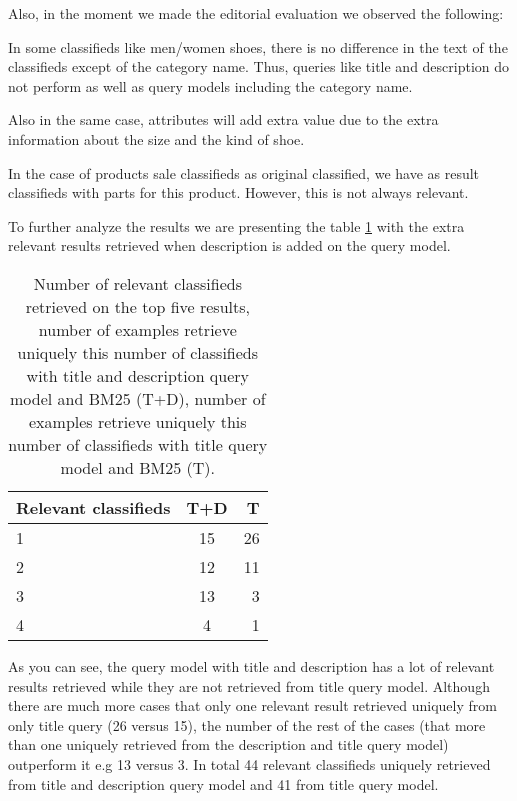 Also, in the moment we made the editorial evaluation we observed the following:

\begin{list}{.}{}
\item{In some classifieds like men/women shoes, there is no difference in the text of the classifieds except of the category name. Thus, queries like title and description do not perform as well as query models including the category name.}
\item{Also in the same case, attributes will add extra value due to the extra information about the size and the kind of shoe.}
\item{In the case of products sale classifieds as original classified, we have as result classifieds with parts for this product. However, this is not always relevant.}
\end{list}
To further analyze the results we are presenting the table \ref{table:titleVsTD} with the extra relevant results retrieved when description is added on the query model.


\begin{table}[H]
\begin{center}
\caption{Number of relevant classifieds retrieved on the top five results, number of examples retrieve uniquely this number of classifieds with title and description query model and BM25 (T+D), number of examples retrieve uniquely this number of classifieds with title query model and BM25 (T).}
\label{table:titleVsTD}
\begin{tabular}{lcr}
\midrule
Relevant classifieds & T+D & T \\
\midrule
	1 & 15 & 26 \\
	2 & 12 & 11  \\
	3 & 13 & 3 \\
	4 & 4 & 1  \\
\bottomrule
\end{tabular}
\end{center}
\end{table}

As you can see, the query model with title and description has a lot of relevant results retrieved while they are not retrieved from title query model. Although there are much more cases that only one relevant result retrieved uniquely from only title query (26 versus 15), the number of the rest of the cases (that more than one uniquely retrieved from the description and title query model) outperform it e.g 13 versus 3. In total 44 relevant classifieds uniquely retrieved from title and description query model and 41 from title query model.




